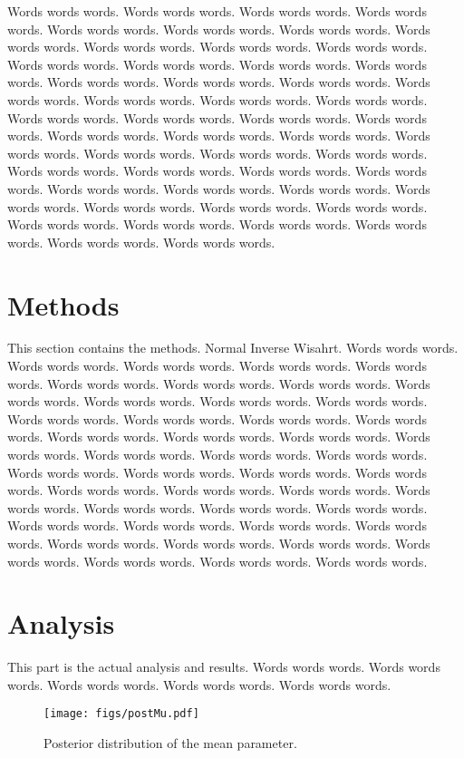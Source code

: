 \documentclass{../../tex_template/asaproc}
\begin{document}
Words words words.  Words words words.  Words words words.  Words words words.  Words words words.
Words words words.  Words words words.  Words words words.  Words words words.  Words words words.
Words words words.  Words words words.  Words words words.  Words words words.  Words words words.
Words words words.  Words words words.  Words words words.  Words words words.  Words words words.
Words words words.  Words words words.  Words words words.  Words words words.  Words words words.
Words words words.  Words words words.  Words words words.  Words words words.  Words words words.
Words words words.  Words words words.  Words words words.  Words words words.  Words words words.
Words words words.  Words words words.  Words words words.  Words words words.  Words words words.
Words words words.  Words words words.  Words words words.  Words words words.  Words words words.
Words words words.  Words words words.  Words words words.  Words words words.  Words words words.

\section{Methods}
This section contains the methods. Normal Inverse Wisahrt.
Words words words.  Words words words.  Words words words.  Words words words.  Words words words.
Words words words.  Words words words.  Words words words.  Words words words.  Words words words.
Words words words.  Words words words.  Words words words.  Words words words.  Words words words.
Words words words.  Words words words.  Words words words.  Words words words.  Words words words.
Words words words.  Words words words.  Words words words.  Words words words.  Words words words.
Words words words.  Words words words.  Words words words.  Words words words.  Words words words.
Words words words.  Words words words.  Words words words.  Words words words.  Words words words.
Words words words.  Words words words.  Words words words.  Words words words.  Words words words.
Words words words.  Words words words.  Words words words.  Words words words.  Words words words.

\section{Analysis}
This part is the actual analysis and results.
Words words words.  Words words words.  Words words words.  Words words words.  Words words words.
\begin{figure}
  \centering
  \texttt{[image: figs/postMu.pdf]}
  \caption{Posterior distribution of the mean parameter.}
  \label{fig:postMu}
\end{figure}
\end{document}
